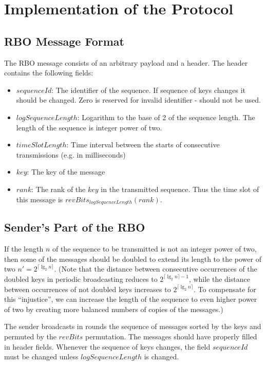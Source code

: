 \documentclass{llncs}
\begin{document}
\section{Implementation of the Protocol}\label{implementation-section}

\subsection{RBO Message Format}
The RBO message consists of an arbitrary payload and a header.
The header contains the following fields:
\begin{itemize}
    \item 
      $sequenceId$: The identifier of the sequence.
      If sequence of keys changes it should be changed. 
      Zero is reserved for invalid identifier - should not be used.
 
    \item
      $logSequenceLength$: Logarithm to the base of 2 of the sequence length. 
      The length of the sequence is integer power of two.
    \item
      $timeSlotLength$: 
      Time interval between the starts of consecutive transmissions (e.g. in milliseconds)
    \item
     $key$: The key of the message

    \item
      $rank$: The rank of the $key$ in the transmitted sequence. 
      Thus the time slot of this message is  $revBits_{logSequenceLength}(rank)$.
\end{itemize}

\subsection{Sender's Part of the RBO}
If the length $n$ of the sequence to be transmitted is not an integer power of two, then
some of the messages should be doubled to extend its length to the power of two $n'=2^{\lceil\lg_2 n\rceil}$.
(Note that the distance between consecutive occurrences of 
the doubled keys in periodic broadcasting reduces to $2^{\lceil\lg_2 n\rceil-1}$,
while the distance between occurrences of not doubled keys increases to $2^{\lceil\lg_2 n\rceil}$.
To compensate for this ``injustice'', we can increase the length of the sequence
to even higher power of two by creating  more balanced numbers of copies of the messages.)

The sender broadcasts in rounds the sequence of messages sorted by the keys and permuted by the 
$revBits$ permutation.
The messages should have properly filled in header fields.
Whenever the sequence of keys changes, the field $sequenceId$ must be changed unless
 $logSequenceLength$ is changed.
 
\end{document}
